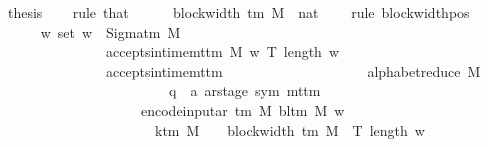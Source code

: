 \begin{isabellebody}
\ {\isacharquery}{\kern0pt}thesis\isanewline
\ \ \isamarkupfalse%
\ {\isacharparenleft}{\kern0pt}rule\ that{\isacharparenright}{\kern0pt}\isanewline
\ \ \ \ \isamarkupfalse%
\ {\isachardoublequoteopen}{\isacharparenleft}{\kern0pt}block{\isacharunderscore}{\kern0pt}width\ {\isacharparenleft}{\kern0pt}{\isasymGamma}{\isacharunderscore}{\kern0pt}tm\ M{\isacharparenright}{\kern0pt}\ {\isacharcolon}{\kern0pt}{\isacharcolon}{\kern0pt}\ nat{\isacharparenright}{\kern0pt}\ {\isasymge}\ {}{\isachardoublequoteclose}\ \isamarkupfalse%
\ {\isacharparenleft}{\kern0pt}rule\ block{\isacharunderscore}{\kern0pt}width{\isacharunderscore}{\kern0pt}pos{\isacharparenright}{\kern0pt}\isanewline
\ \ \isamarkupfalse%
\isanewline
\ \ \ \ \isamarkupfalse%
\ {\isachardoublequoteopen}{\isasymforall}w{\isachardot}{\kern0pt}\ set\ w\ {\isasymsubseteq}\ Sigma{\isacharunderscore}{\kern0pt}tm\ M\isanewline
\ \ \ \ \ \ \ \ \ \ \ \ \ \ {\isasymlongrightarrow}\ accepts{\isacharunderscore}{\kern0pt}in{\isacharunderscore}{\kern0pt}time{\isacharunderscore}{\kern0pt}mttm\ M\ w\ {\isacharparenleft}{\kern0pt}T\ {\isacharparenleft}{\kern0pt}length\ w{\isacharparenright}{\kern0pt}{\isacharparenright}{\kern0pt}\isanewline
\ \ \ \ \ \ \ \ \ \ \ \ \ \ {\isasymlongrightarrow}\ accepts{\isacharunderscore}{\kern0pt}in{\isacharunderscore}{\kern0pt}time{\isacharunderscore}{\kern0pt}mttm\isanewline
\ \ \ \ \ \ \ \ \ \ \ \ \ \ \ \ \ \ \ \ {\isacharparenleft}{\kern0pt}alphabet{\isacharunderscore}{\kern0pt}reduce\ M\isanewline
\ \ \ \ \ \ \ \ \ \ \ \ \ \ \ \ \ \ \ \ \ \ \ {\isacharcolon}{\kern0pt}{\isacharcolon}{\kern0pt}\ {\isacharparenleft}{\kern0pt}{\isacharprime}{\kern0pt}q\ {\isasymtimes}\ {\isacharprime}{\kern0pt}a\ ar{\isacharunderscore}{\kern0pt}stage{\isacharcomma}{\kern0pt}\ sym{}{\isacharparenright}{\kern0pt}\ mttm{\isacharparenright}{\kern0pt}\isanewline
\ \ \ \ \ \ \ \ \ \ \ \ \ \ \ \ \ \ \ \ {\isacharparenleft}{\kern0pt}encode{\isacharunderscore}{\kern0pt}input{\isacharunderscore}{\kern0pt}ar\ {\isacharparenleft}{\kern0pt}{\isasymGamma}{\isacharunderscore}{\kern0pt}tm\ M{\isacharparenright}{\kern0pt}\ {\isacharparenleft}{\kern0pt}bl{\isacharunderscore}{\kern0pt}tm\ M{\isacharparenright}{\kern0pt}\ w{\isacharparenright}{\kern0pt}\isanewline
\ \ \ \ \ \ \ \ \ \ \ \ \ \ \ \ \ \ \ \ {\isacharparenleft}{\kern0pt}{\isacharparenleft}{\kern0pt}{}\ {\isacharasterisk}{\kern0pt}\ k{\isacharunderscore}{\kern0pt}tm\ M\ {\isacharplus}{\kern0pt}\ {}{\isacharparenright}{\kern0pt}\ {\isacharasterisk}{\kern0pt}\ block{\isacharunderscore}{\kern0pt}width\ {\isacharparenleft}{\kern0pt}{\isasymGamma}{\isacharunderscore}{\kern0pt}tm\ M{\isacharparenright}{\kern0pt}\ {\isacharasterisk}{\kern0pt}\ T\ {\isacharparenleft}{\kern0pt}length\ w{\isacharparenright}{\kern0pt}\isanewline

\end{isabellebody}
